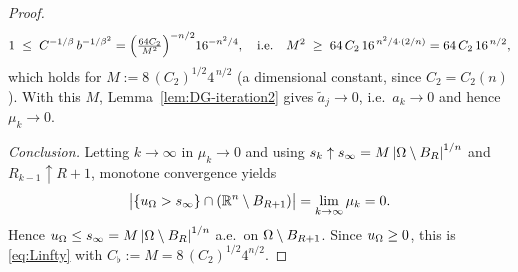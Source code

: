 \begin{proof}
\[
   1\;\le\;C^{-1/\beta}\,b^{-1/\beta^2}
   =\Bigl(\tfrac{64C_2}{M^2}\Bigr)^{-n/2}16^{-n^2/4},
   \quad\text{i.e.}\quad
   M^2\;\ge\;64\,C_2\,16^{\,n^2/4\cdot(2/n)}=64\,C_2\,16^{\,n/2},
\]
which holds for $M:=8\,(C_2)^{1/2}4^{\,n/2}$ (a dimensional constant,
since $C_2=C_2(n)$). With this $M$, Lemma~\ref{lem:DG-iteration2} gives
$\widetilde a_j\to0$, i.e.\ $a_k\to0$ and hence $\mu_k\to0$.

\smallskip
\emph{Conclusion.} Letting $k\to\infty$ in $\mu_k\to0$ and using
$s_k\uparrow s_\infty=M\left|\Omega\setminus B_R\right|^{1/n}$ and
$R_{k-1}\uparrow R+1$, monotone convergence yields
\[
   \bigl|\{u_\Omega>s_\infty\}\cap(\mathbb R^n\setminus B_{R+1})\bigr|
   =\lim_{k\to\infty}\mu_k=0 .
\]
Hence $u_\Omega\le s_\infty=M\left|\Omega\setminus B_R\right|^{1/n}$ a.e.\ on
$\Omega\setminus B_{R+1}$. Since $u_\Omega\ge0$, this is
\eqref{eq:Linfty} with $C_\flat:=M=8\,(C_2)^{1/2}4^{n/2}$.
\end{proof}

